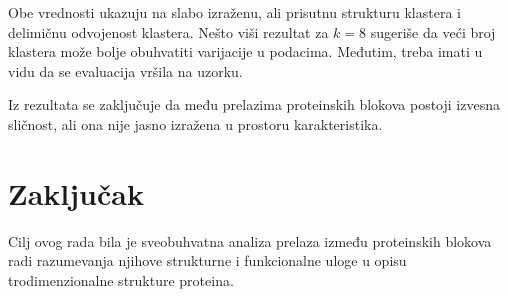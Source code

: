 \documentclass[a4paper,12pt]{article}
\begin{document}
Obe vrednosti ukazuju na slabo izraženu, ali prisutnu strukturu klastera i delimičnu odvojenost klastera. Nešto viši rezultat za $k=8$ sugeriše da veći broj klastera može bolje obuhvatiti varijacije u podacima. Međutim, treba imati u vidu da se evaluacija vršila na uzorku.

Iz rezultata se zaključuje da među prelazima proteinskih blokova postoji izvesna sličnost, ali ona nije jasno izražena u prostoru karakteristika.
\newpage
\section{Zaključak}
Cilj ovog rada bila je sveobuhvatna analiza prelaza između proteinskih blokova radi razumevanja njihove strukturne i funkcionalne uloge u opisu trodimenzionalne strukture proteina.\\
\\
\end{document}
